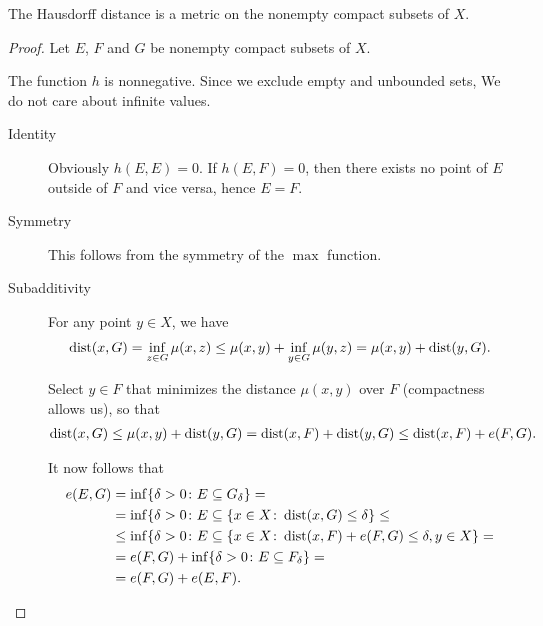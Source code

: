 \begin{proposition}
  The Hausdorff distance is a metric on the nonempty compact subsets of $X$.
\end{proposition}
\begin{proof}
  Let $E$, $F$ and $G$ be nonempty compact subsets of $X$.

  The function $h$ is nonnegative. Since we exclude empty and unbounded sets, We do not care about infinite values.

  \begin{description}
    \item[Identity] Obviously $h(E, E) = 0$. If $h(E, F) = 0$, then there exists no point of $E$ outside of $F$ and vice versa, hence $E = F$.
    \item[Symmetry] This follows from the symmetry of the $\max$ function.
    \item[Subadditivity] For any point $y \in X$, we have
    \begin{align*}
      \operatorname{dist}(x, G)
      =
      \inf_{z \in G} \mu(x, z)
      \leq
      \mu(x, y) + \inf_{y \in G} \mu(y, z)
      =
      \mu(x, y) + \operatorname{dist}(y, G).
    \end{align*}

    Select $y \in F$ that minimizes the distance $\mu(x, y)$ over $F$ (compactness allows us), so that %
    \begin{align*}
      \operatorname{dist}(x, G)
      \leq
      \mu(x, y) + \operatorname{dist}(y, G)
      =
      \operatorname{dist}(x, F) + \operatorname{dist}(y, G)
      \leq
      \operatorname{dist}(x, F) + e(F, G).
    \end{align*}

    It now follows that
    \begin{align*}
      e(E, G)
      &=
      \inf \{\delta > 0 \colon E \subseteq G_\delta \}
      = \\ &=
      \inf \{\delta > 0 \colon E \subseteq \{ x \in X \colon \operatorname{dist}(x, G) \leq \delta \}
      \leq \\ &\leq
      \inf \{\delta > 0 \colon E \subseteq \{ x \in X \colon \operatorname{dist}(x, F) + e(F, G) \leq \delta, y \in X \}
      = \\ &=
      e(F, G) + \inf \{\delta > 0 \colon E \subseteq F_\delta \}
      = \\ &=
      e(F, G) + e(E, F).
    \end{align*}
  \end{description}
\end{proof}
